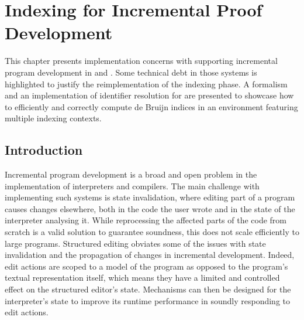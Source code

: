 \chapter{Indexing for Incremental Proof Development}

This chapter presents implementation concerns with supporting incremental program development in \Beluga and \Harpoon.
Some technical debt in those systems is highlighted to justify the reimplementation of the indexing phase.
A formalism and an implementation of identifier resolution for \Beluga are presented to showcase how to efficiently and correctly compute de Bruijn indices in an environment featuring multiple indexing contexts.

\section{Introduction}


Incremental program development is a broad and open problem in the implementation of interpreters and compilers.
The main challenge with implementing such systems is state invalidation, where editing part of a program causes changes elsewhere, both in the code the user wrote and in the state of the interpreter analysing it.
While reprocessing the affected parts of the code from scratch is a valid solution to guarantee soundness, this does not scale efficiently to large programs.
Structured editing obviates some of the issues with state invalidation and the propagation of changes in incremental development.
Indeed, edit actions are scoped to a model of the program as opposed to the program's textual representation itself, which means they have a limited and controlled effect on the structured editor's state.
Mechanisms can then be designed for the interpreter's state to improve its runtime performance in soundly responding to edit actions.


